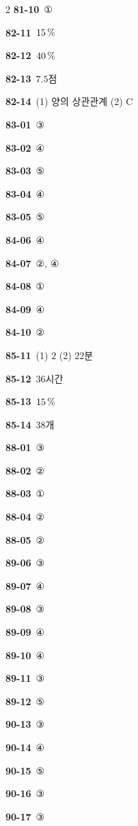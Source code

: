 \documentclass[10pt,a4paper]{article}
\newcommand{\pt}[1]{\mathrm{#1}}
\begin{document}
\begin{multicols}{2}
\noindent\textbf{81-10}\ ①\par
\noindent\textbf{82-11}\ $15\mkern3mu \%$\par
\noindent\textbf{82-12}\ $40\mkern3mu \%$\par
\noindent\textbf{82-13}\ $7.5$점\par
\noindent\textbf{82-14}\ (1) 양의 상관관계 (2) $\pt{C}$\par
\noindent\textbf{83-01}\ ③\par
\noindent\textbf{83-02}\ ④\par
\noindent\textbf{83-03}\ ⑤\par
\noindent\textbf{83-04}\ ④\par
\noindent\textbf{83-05}\ ⑤\par
\noindent\textbf{84-06}\ ④\par
\noindent\textbf{84-07}\ ②, ④\par
\noindent\textbf{84-08}\ ①\par
\noindent\textbf{84-09}\ ④\par
\noindent\textbf{84-10}\ ②\par
\noindent\textbf{85-11}\ (1) $2$ (2) $22$분\par
\noindent\textbf{85-12}\ $36$시간\par
\noindent\textbf{85-13}\ $15\mkern3mu \%$\par
\noindent\textbf{85-14}\ $38$개\par
\noindent\textbf{88-01}\ ③\par
\noindent\textbf{88-02}\ ②\par
\noindent\textbf{88-03}\ ①\par
\noindent\textbf{88-04}\ ②\par
\noindent\textbf{88-05}\ ②\par
\noindent\textbf{89-06}\ ③\par
\noindent\textbf{89-07}\ ④\par
\noindent\textbf{89-08}\ ③\par
\noindent\textbf{89-09}\ ④\par
\noindent\textbf{89-10}\ ④\par
\noindent\textbf{89-11}\ ③\par
\noindent\textbf{89-12}\ ⑤\par
\noindent\textbf{90-13}\ ③\par
\noindent\textbf{90-14}\ ④\par
\noindent\textbf{90-15}\ ⑤\par
\noindent\textbf{90-16}\ ③\par
\noindent\textbf{90-17}\ ③\par

\end{multicols}
\end{document}
